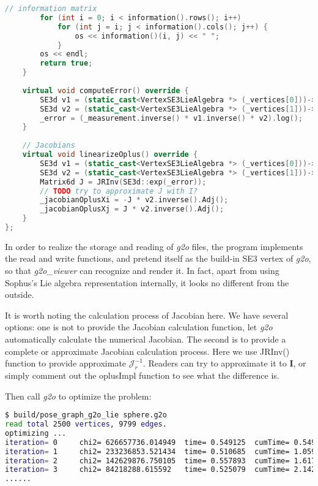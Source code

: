 \begin{lstlisting}[language=c++,caption=slambook2/ch10/pose\_graph\_g2o\_lie\_algebra.cpp (part)]
		// information matrix 
		for (int i = 0; i < information().rows(); i++)
			for (int j = i; j < information().cols(); j++) {
				os << information()(i, j) << " ";
			}
		os << endl;
		return true;
	}
	
	virtual void computeError() override {
		SE3d v1 = (static_cast<VertexSE3LieAlgebra *> (_vertices[0]))->estimate();
		SE3d v2 = (static_cast<VertexSE3LieAlgebra *> (_vertices[1]))->estimate();
		_error = (_measurement.inverse() * v1.inverse() * v2).log();
	}
	
	// Jacobians
	virtual void linearizeOplus() override {
		SE3d v1 = (static_cast<VertexSE3LieAlgebra *> (_vertices[0]))->estimate();
		SE3d v2 = (static_cast<VertexSE3LieAlgebra *> (_vertices[1]))->estimate();
		Matrix6d J = JRInv(SE3d::exp(_error));
		// TODO try to approximate J with I?
		_jacobianOplusXi = -J * v2.inverse().Adj();
		_jacobianOplusXj = J * v2.inverse().Adj();
	}
};
\end{lstlisting}

In order to realize the storage and reading of \textit{g2o} files, the program implements the read and write functions, and pretend itself as the build-in SE3 vertex of \textit{g2o}, so that \textit{g2o\_viewer} can recognize and render it. In fact, apart from using Sophus's Lie algebra representation internally, it looks no different from the outside.

It is worth noting the calculation process of Jacobian here. We have several options: one is not to provide the Jacobian calculation function, let \textit{g2o} automatically calculate the numerical Jacobian. The second is to provide a complete or approximate Jacobian calculation process. Here we use JRInv() function to provide approximate $\bm{\mathcal{J}}_r^{-1}$. Readers can try to approximate it to $\bm{I}$, or simply comment out the oplusImpl function to see what the difference is.

Then call \textit{g2o} to optimize the problem:
\begin{lstlisting}[language=sh,caption=Terminal input:]
$ build/pose_graph_g2o_lie sphere.g2o    
read total 2500 vertices, 9799 edges.
optimizing ...
iteration= 0	 chi2= 626657736.014949	 time= 0.549125	 cumTime= 0.549125	 edges= 9799	 schur= 0	 lambda= 6706.585223	 levenbergIter= 1
iteration= 1	 chi2= 233236853.521434	 time= 0.510685	 cumTime= 1.05981	 edges= 9799	 schur= 0	 lambda= 2235.528408	 levenbergIter= 1
iteration= 2	 chi2= 142629876.750105	 time= 0.557893	 cumTime= 1.6177	 edges= 9799	 schur= 0	 lambda= 745.176136	 levenbergIter= 1
iteration= 3	 chi2= 84218288.615592	 time= 0.525079	 cumTime= 2.14278	 edges= 9799	 schur= 0	 lambda= 248.392045	 levenbergIter= 1
......
\end{lstlisting}

